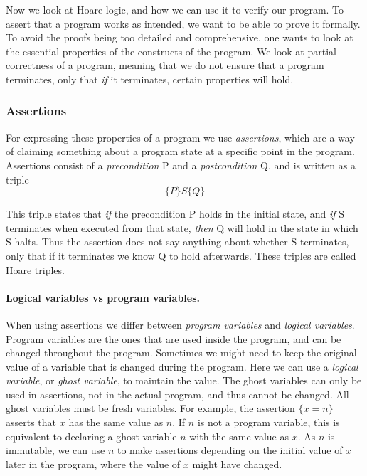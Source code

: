Now we look at Hoare logic, and how we can use it to verify our program.
To assert that a program works as intended, we want to be able to prove it formally. To avoid the proofs being too detailed and comprehensive, one wants to look at the essential properties of the constructs of the program. We look at partial correctness of a program, meaning that we do not ensure that a program terminates, only that \textit{if} it terminates, certain properties will hold.

\subsubsection{Assertions}
For expressing these properties of a program we use \textit{assertions}, which are a way of claiming something about a program state at a specific point in the program.
Assertions consist of a \textit{precondition} P and a \textit{postcondition} Q, and is written as a triple
$$ \{ P \} S \{ Q \} $$

This triple states that \textit{if} the precondition P holds in the initial state, and \textit{if} S terminates when executed from that state, \textit{then} Q will hold in the state in which S halts.
Thus the assertion does not say anything about whether S terminates, only that if it terminates we know Q to hold afterwards. These triples are called Hoare triples.

\paragraph{Logical variables vs program variables.}
When using assertions we differ between \textit{program variables} and \textit{logical variables}.
Program variables are the ones that are used inside the program, and can be changed throughout the program.
Sometimes we might need to keep the original value of a variable that is changed during the program. Here we can use a \textit{logical variable}, or \textit{ghost variable}, to maintain the value. The ghost variables can only be used in assertions, not in the actual program, and thus cannot be changed. All ghost variables must be fresh variables. 
For example, the assertion $\{x = n\}$ asserts that $x$ has the same value as $n$. If $n$ is not a program variable, this is equivalent to declaring a ghost variable $n$ with the same value as $x$. As $n$ is immutable, we can use $n$ to make assertions depending on the initial value of $x$ later in the program, where the value of $x$ might have changed.

